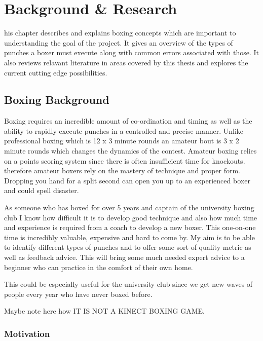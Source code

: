 %
%
\let\textcircled=\pgftextcircled
\chapter{Background \& Research}
\label{chap:intro}

his chapter describes and explains boxing concepts which are important to understanding the goal of the project. It gives an overview of the types of punches a boxer must execute along with common errors associated with those. It also reviews relavant literature in areas covered by this thesis and explores the current cutting edge possibilities.

\section{Boxing Background}
\label{sec:sec01}

Boxing requires an incredible amount of co-ordination and timing as well as the ability to rapidly execute punches in a controlled and precise manner. Unlike professional boxing which is 12 x 3 minute rounds an amateur bout is 3 x 2 minute rounds which changes the dynamics of the contest. Amateur boxing relies on a points scoring system since there is often insufficient time for knockouts. therefore amateur boxers rely on the mastery of technique and proper form. Dropping you hand for a split second can open you up to an experienced boxer and could spell disaster.

As someone who has boxed for over 5 years and captain of the university boxing club I know how difficult it is to develop good technique and also how much time and experience is required from a coach to develop a new boxer. This one-on-one time is incredibly valuable, expensive and hard to come by. My aim is to be able to identify different types of punches and to offer some sort of quality metric as well as feedback advice. This will bring some much needed expert advice to a beginner who can practice in the comfort of their own home.

This could be especially useful for the university club since we get new waves of people every year who have never boxed before. 

Maybe note here how IT IS NOT A KINECT BOXING GAME.

\subsection{Motivation}
\label{subsec:subsec01}

